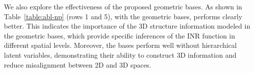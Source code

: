 {}
We also explore the effectiveness of the proposed geometric bases. As shown in Table~\ref{table:abl-np} (rows 1 and 5), with the geometric bases, \method{} performs clearly better. This indicates the importance of the 3D structure information modeled in the geometric bases, which provide specific inferences of the INR function in different spatial levels. Moreover, the bases perform well without hierarchical latent variables, demonstrating their ability to construct 3D information and reduce misalignment between 2D and 3D spaces.







% 




